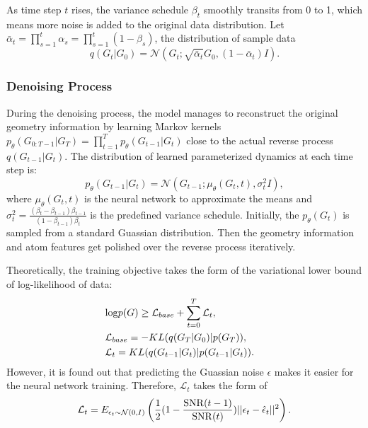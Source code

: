 \documentclass[letterpaper]{article}
\begin{document}
As time step $t$ rises, the variance schedule $\beta_t$ smoothly transits from 0 to 1, which means more noise is added to the original data distribution. Let $\bar{\alpha}_t = \prod^t_{s=1} \alpha_s = \prod^t_{s=1}(1-\beta_s)$, the distribution of sample data
\begin{equation}
q(G_t|G_0) = \mathcal{N}(G_t; \sqrt{\bar{\alpha}_t} G_0, (1 - \bar{\alpha}_t) I).
\end{equation}

\subsubsection{Denoising Process}
During the denoising process, the model manages to reconstruct the original geometry information by learning Markov kernels $p_\theta(G_{0:T-1}| G_{T}) = \prod^T_{t=1} p_\theta(G_{t-1} | G_t)$ close to the actual reverse process $q(G_{t-1} | G_t)$. The distribution of learned parameterized dynamics at each time step is:
\begin{equation}
p_\theta(G_{t-1} | G_t) = \mathcal{N}(G_{t-1}; \mu_\theta(G_t, t), \sigma_t^2 I),
\end{equation}
where $\mu_\theta(G_t, t)$ is the neural network to approximate the means and $\sigma^2_t = \frac{(\beta_t - \beta_{t-1})\beta_{t-1}}{(1 - \beta_{t-1}) \beta_t}$ is the predefined variance schedule. Initially, the $p_\theta(G_t)$ is sampled from a standard Guassian distribution. Then the geometry information and atom features get polished over the reverse process iteratively.

Theoretically, the training objective takes the form of the variational lower bound of log-likelihood of data:
\begin{eqnarray}
&{\rm log}p(G) \geq \mathcal{L}_{base} + \sum_{t=0}^T \mathcal{L}_t,& \\
&\mathcal{L}_{base} = -KL(q(G_T|G_0)|p(G_T)),& \\
&\mathcal{L}_t = KL(q(G_{t-1}|G_t)|p(G_{t-1}|G_t)). &
\end{eqnarray}
However, it is found out that predicting the Guassian noise $\epsilon$ makes it easier for the neural network training. Therefore, $\mathcal{L}_t$ \cite{vaediff_21_kingma} takes the form of
\begin{equation}
\mathcal{L}_t = E_{\epsilon_t \sim \mathcal{N}(0, I)}\left(\frac{1}{2}(1- \frac{{\rm SNR}(t-1)}{{\rm SNR}(t)})||\epsilon_t - \hat{\epsilon}_t||^2\right).
\end{equation}
\end{document}
